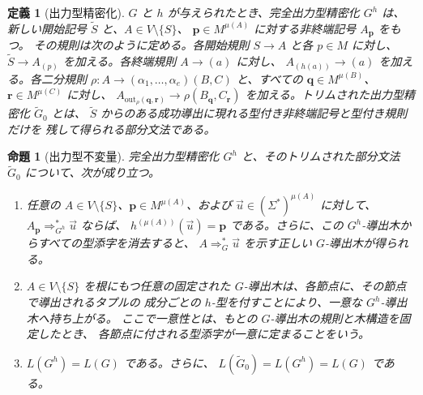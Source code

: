 \documentclass[11pt,a4paper]{ltjsarticle}
\newtheorem{proposition}[theorem]{命題}
\newtheorem{definition}[theorem]{定義}
\theoremstyle{remark}
\newcommand{\out}{\mathrm{out}}
\newcommand{\tuple}[1]{\vec{#1}}
\begin{document}
\begin{definition}[出力型精密化]
\label{def:output-refinement}
\(G\) と \(h\) が与えられたとき、完全出力型精密化 \(G^h\) は、新しい開始記号
\(\widetilde S\) と、\(A\in V\setminus\{S\}\)、
\(\mathbf p\in M^{\mu(A)}\) に対する非終端記号 \(A_{\mathbf p}\) をもつ。
その規則は次のように定める。各開始規則 \(S\to A\) と各 \(p\in M\) に対し、
\(\widetilde S\to A_{(p)}\) を加える。各終端規則 \(A\to(a)\) に対し、
\(A_{(h(a))}\to(a)\) を加える。各二分規則
\(\rho\colon A\to(\alpha_1,\ldots,\alpha_e)(B,C)\) と、すべての
\(\mathbf q\in M^{\mu(B)}\)、\(\mathbf r\in M^{\mu(C)}\) に対し、
\(A_{\out_\rho(\mathbf q,\mathbf r)}\to\rho(B_{\mathbf q},C_{\mathbf r})\)
を加える。トリムされた出力型精密化 \(\widetilde G_0\) とは、
\(\widetilde S\) からのある成功導出に現れる型付き非終端記号と型付き規則だけを
残して得られる部分文法である。
\end{definition}

\begin{proposition}[出力型不変量]
\label{prop:output-invariants}
完全出力型精密化 \(G^h\) と、そのトリムされた部分文法
\(\widetilde G_0\) について、次が成り立つ。
\begin{enumerate}[label=(\roman*),leftmargin=*]
\item 任意の \(A\in V\setminus\{S\}\)、\(\mathbf p\in M^{\mu(A)}\)、および
      \(\tuple u\in(\Sigma^*)^{\mu(A)}\) に対して、
      \(A_{\mathbf p}\Rightarrow_{G^h}^*\tuple u\) ならば、
      \(h^{(\mu(A))}(\tuple u)=\mathbf p\) である。さらに、この
      \(G^h\)-導出木からすべての型添字を消去すると、
      \(A\Rightarrow_G^*\tuple u\) を示す正しい \(G\)-導出木が得られる。

\item \(A\in V\setminus\{S\}\) を根にもつ任意の固定された
      \(G\)-導出木は、各節点に、その節点で導出されるタプルの
      成分ごとの \(h\)-型を付すことにより、一意な
      \(G^h\)-導出木へ持ち上がる。
      ここで一意性とは、もとの \(G\)-導出木の規則と木構造を固定したとき、
      各節点に付される型添字が一意に定まることをいう。

\item \(L(G^h)=L(G)\) である。さらに、
      \(L(\widetilde G_0)=L(G^h)=L(G)\) である。
\end{enumerate}
\end{proposition}
\end{document}
